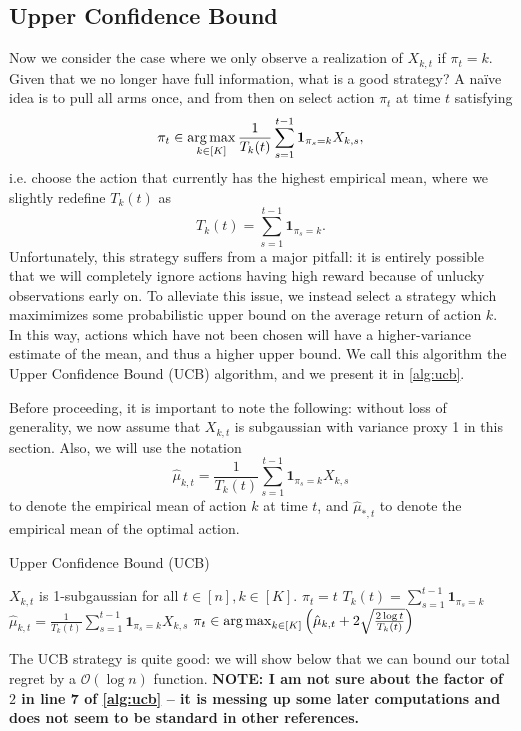\subsection{Upper Confidence Bound}
Now we consider the case where we only observe a realization of $X_{k,t}$ if $\pi_t = k$. Given that we no longer have full information, what is a good strategy? A na\"ive idea is to pull all arms once, and from then on select action $\pi_t$ at time $t$ satisfying
\[
\pi_t \in \operatorname*{arg\,max}_{k \in [K]} \frac{1}{T_k(t)} \sum_{s=1}^{t-1}\mathbf{1}_{\pi_s = k} X_{k, s},
\]
i.e. choose the action that currently has the highest empirical mean, where we slightly redefine $T_k(t)$ as
\[
T_k(t) = \sum_{s=1}^{t-1} \mathbf{1}_{\pi_s = k}.
\]
Unfortunately, this strategy suffers from a major pitfall: it is entirely possible that we will completely ignore actions having high reward because of unlucky observations early on. To alleviate this issue, we instead select a strategy which maximimizes some probabilistic upper bound on the average return of action $k$. In this way, actions which have not been chosen will have a higher-variance estimate of the mean, and thus a higher upper bound. We call this algorithm the Upper Confidence Bound (UCB) algorithm, and we present it in \autoref{alg:ucb}.

Before proceeding, it is important to note the following: without loss of generality, we now assume that $X_{k, t}$ is subgaussian with variance proxy 1 in this section. Also, we will use the notation
\[
\hat \mu_{k, t} = \frac{1}{T_k(t)} \sum_{s=1}^{t-1}\mathbf{1}_{\pi_s = k} X_{k, s}
\]
to denote the empirical mean of action $k$ at time $t$, and $\hat \mu_{*, t}$ to denote the empirical mean of the optimal action.

\begin{algorithm}
\caption{Upper Confidence Bound (UCB)}
   \begin{algorithmic}[1] \label{alg:ucb}
   \REQUIRE $X_{k, t}$ is 1-subgaussian for all $t \in [n], k \in [K]$.
   	\STATE $\pi_t = t$
   \ENDFOR
   	\STATE $T_k(t) = \sum_{s=1}^{t-1} \mathbf{1}_{\pi_s = k}$
	\STATE $\hat \mu_{k, t} = \frac{1}{T_k(t)} \sum_{s=1}^{t-1}\mathbf{1}_{\pi_s = k} X_{k, s}$
   	\STATE $\pi_t \in \operatorname*{arg\,max}_{k \in [K]}\left(\hat \mu_{k, t} + 2 \sqrt{\frac{2 \log t}{T_k(t)}} \right)$
   \ENDFOR
\end{algorithmic}
\end{algorithm}

The UCB strategy is quite good: we will show below that we can bound our total regret by a $\mathcal{O}(\log n)$ function. \textbf{NOTE: I am not sure about the factor of $2$ in line 7 of \autoref{alg:ucb} -- it is messing up some later computations and does not seem to be standard in other references.}

